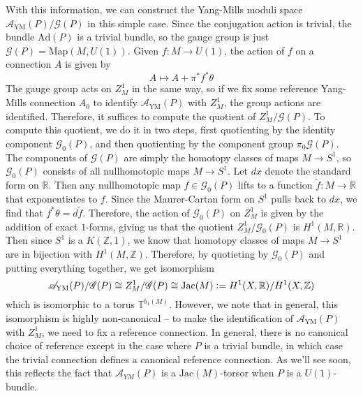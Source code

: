 \documentclass[psamsfonts, 12pt]{amsart}
\theoremstyle{definition}
\theoremstyle{remark}
\newcommand{\R}{\mathbb{R}}
\newcommand{\Z}{\mathbb{Z}}
\newcommand{\defeq}{\vcentcolon=}
\begin{document}
With this information, we can construct the Yang-Mills moduli space
$\mathscr{A}_{\text{YM}}(P) / \mathscr{G}(P)$ in this simple case. Since the
conjugation action is trivial, the bundle $\mathrm{Ad}(P)$ is a trivial bundle,
so the gauge group is just $\mathscr{G}(P) = \mathrm{Map}(M,U(1))$. Given
$f : M \to U(1)$, the action of $f$ on a connection $A$ is given by
\[
A \mapsto A + \pi^*f^*\theta
\]
The gauge group acts on $Z^1_M$ in the same way, so if we fix some reference Yang-Mills
connection $A_0$ to identify $\mathscr{A}_{\text{YM}}(P)$ with $Z^1_M$, the
group actions are identified. Therefore, it suffices to compute the quotient
of $Z^1_M/\mathscr{G}(P)$. To compute this quotient, we do it in two steps,
first quotienting by the identity component $\mathscr{G}_0(P)$, and then quotienting
by the component group $\pi_0\mathscr{G}(P)$. The components of $\mathscr{G}(P)$
are simply the homotopy classes of maps $M \to S^1$, so $\mathscr{G}_0(P)$ consists
of all nullhomotopic maps $M \to S^1$. Let $dx$ denote the standard form
on $\R$. Then any nullhomotopic map $f \in \mathscr{G}_0(P)$ lifts to a function
$\tilde{f} : M \to \R$ that exponentiates to $f$. Since the Maurer-Cartan form
on $S^1$ pulls back to $dx$, we find that $f^*\theta = d\tilde{f}$. Therefore,
the action of $\mathscr{G}_0(P)$ on $Z^1_M$ is given by the addition of exact
$1$-forms, giving us that the quotient $Z^1_M / \mathscr{G}_0(P)$ is
$H^1(M,\R)$. Then since $S^1$ is a $K(\Z,1)$, we know that homotopy classes
of maps $M \to S^1$ are in bijection with $H^1(M,\Z)$. Therefore, by quotieting
by $\mathscr{G}_0(P)$ and putting everything together, we get isomorphism
\[
\mathscr{A}_{\text{YM}}(P) /\mathscr{G}(P) \cong Z^1_M/\mathscr{G}(P)
\cong \mathrm{Jac}(M) \defeq H^1(X,\R)/H^1(X,\Z)
\]
which is isomorphic to a torus $\mathbb{T}^{b_1(M)}$. However, we note that in general,
this isomorphism is highly non-canonical -- to make the identification of
$\mathscr{A}_{\text{YM}}(P)$ with $Z^1_M$, we need to fix a reference connection. In
general, there is no canonical choice of reference except in the case where $P$ is a
trivial bundle, in which case the trivial connection defines a canonical reference
connection. As we'll see soon, this reflects the fact that $\mathscr{A}_{YM}(P)$
is a $\mathrm{Jac}(M)$-torsor when $P$ is a $U(1)$-bundle.
%
%
\end{document}
